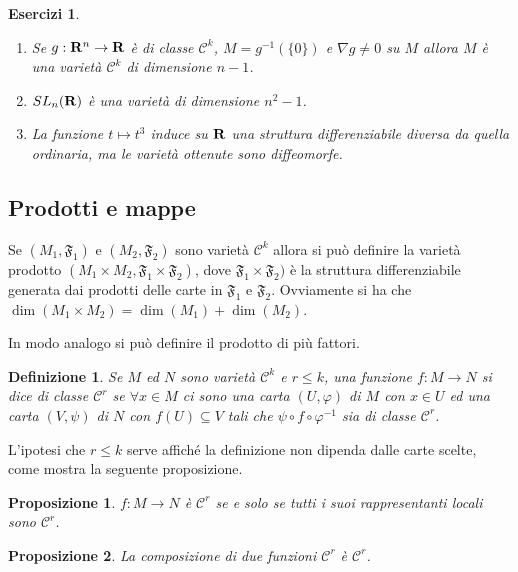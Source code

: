 \documentclass{article}
\newcommand{\PHI}{\varphi}
\newcommand{\incluso}{\subseteq}
\newcommand{\composto}{\circ}
\newcommand{\inv}{^{-1}}
\newcommand{\ci}[1]{\mathscr{#1}}%
\newcommand{\g}[1]{\mathfrak{#1}}
\newcommand{\volte}{\times}
\newcommand{\perogni}{\forall}
\newtheorem{definizione}{ Definizione}
\newtheorem*{esercizi}{ Esercizi}
\newtheorem{proposizione}{ Proposizione}
\begin{document}
 \begin{esercizi}
  \begin{enumerate}[label=\bf\Roman*)]
   \item Se $g:{\bf R}^n\to{\bf R}$ è di classe $\ci{C}^k$, $M=g\inv(\{0\})$ e $\nabla g\ne 0$
   su $M$ allora $M$ è una varietà $\ci{C}^k$ di dimensione $n-1$.
   \item $SL_n({\bf R})$ è una varietà di dimensione $n^2-1$.
   \item La funzione $t\mapsto t^3$ induce su ${\bf R}$ una struttura differenziabile diversa
   da quella ordinaria, ma le varietà ottenute sono diffeomorfe.
  \end{enumerate}
 \end{esercizi}
 
 \subsection{ Prodotti e mappe}
 
 Se $(M_1,\g{F}_1)$ e $(M_2,\g{F}_2)$ sono varietà $\ci{C}^k$ allora si può definire la
 varietà prodotto $(M_1\volte M_2,\g{F}_1\volte\g{F}_2)$, dove $\g{F}_1\volte\g{F}_2)$
 è la struttura differenziabile generata dai prodotti delle carte in $\g{F}_1$ e $\g{F}_2$.
 Ovviamente si ha che $\dim(M_1\volte M_2)=\dim(M_1)+\dim(M_2)$.
 
 In modo analogo si può definire il prodotto di più fattori.
 
 \begin{definizione}
  Se $M$ ed $N$ sono varietà $\ci{C}^k$ e $r\le k$, una funzione $f:M\to N$ si dice
  di classe $\ci{C}^r$ se $\perogni x\in M$ ci sono una carta $(U,\PHI)$ di $M$ con
  $x\in U$ ed una carta $(V,\psi)$ di $N$ con $f(U)\incluso V$ tali che $\psi\composto f\composto\PHI\inv$
  sia di classe $\ci{C}^r$.
 \end{definizione}
 
 L'ipotesi che $r\le k$ serve affiché la definizione non dipenda dalle carte scelte, come
 mostra la seguente proposizione.
 
 \begin{proposizione}
  $f:M\to N$ è $\ci{C}^r$ se e solo se tutti i suoi rappresentanti locali sono $\ci{C}^r$.
 \end{proposizione}
 
 \begin{proposizione}
   La composizione di due funzioni $\ci{C}^r$ è $\ci{C}^r$.
 \end{proposizione}
 
\end{document}
